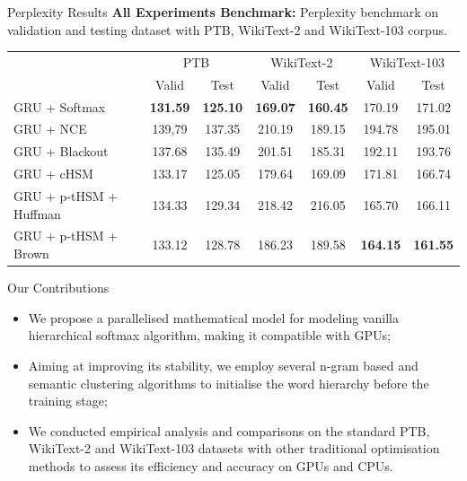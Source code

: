 \documentclass[final,t,unknownkeysallowed]{beamer}
\begin{document}
\begin{frame}{}
\begin{columns}[t]
\begin{column}{.3\linewidth}
\begin{block}{Perplexity Results}
\vspace{3ex}
\textbf{All Experiments Benchmark:} Perplexity benchmark on validation and testing dataset with PTB, WikiText-2 and WikiText-103 corpus.
\begin{table}
\setlength{\abovecaptionskip}{0pt}
\setlength{\abovedisplayskip}{0pt}
  \centering
\begin{tabular}{lcccccc}
  \toprule
  & \multicolumn{2}{c}{PTB} & \multicolumn{2}{c}{WikiText-2} & \multicolumn{2}{c}{WikiText-103} \\
  \cmidrule(lr){2-3} \cmidrule(lr){4-5} \cmidrule(lr){6-7}
  & Valid & Test& Valid & Test  & Valid & Test \\ \midrule
  GRU + Softmax                                             &\textbf{131.59}&\textbf{125.10} &\textbf{169.07}&\textbf{160.45}&170.19&171.02\\
  GRU + NCE             &139,79&137.35 &210.19&189.15&194.78&195.01\\
  GRU + Blackout          &137.68&135.49 &201.51&185.31&192.11&193.76\\
  GRU + cHSM                  &133.17&125.05 &179.64&169.09&171.81&166.74\\  \midrule
  GRU + p-tHSM + Huffman &134.33&129.34 &218.42&216.05& 165.70&166.11\\
GRU + p-tHSM + Brown &133.12&128.78       &186.23&189.58 &\textbf{164.15}& \textbf{161.55} \\
  \bottomrule
\end{tabular}
\end{table}
      \end{block}

      \begin{block}{Our Contributions}
	\begin{itemize}
	\item We propose a parallelised mathematical model for modeling vanilla hierarchical softmax algorithm, making it compatible with GPUs;
    \item Aiming at improving its stability, we employ several n-gram based and semantic clustering algorithms to initialise the word hierarchy before the training stage;
    \item We conducted empirical analysis and comparisons on the standard PTB, WikiText-2 and WikiText-103 datasets with other traditional optimisation methods to assess its efficiency and accuracy on GPUs and CPUs.
	\end{itemize}
      \end{block}
    \end{column}
  \end{columns}
\end{frame}
\end{document}
